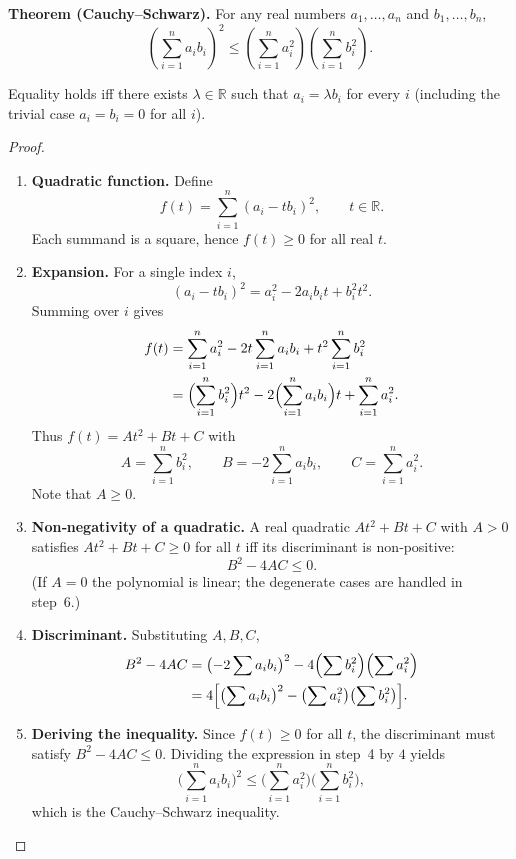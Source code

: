 \textbf{Theorem (Cauchy–Schwarz).}  
For any real numbers $a_{1},\dots ,a_{n}$ and $b_{1},\dots ,b_{n}$,
\[
\left(\sum_{i=1}^{n} a_{i}b_{i}\right)^{2}
\le
\left(\sum_{i=1}^{n} a_{i}^{2}\right)
\left(\sum_{i=1}^{n} b_{i}^{2}\right).
\]

Equality holds iff there exists $\lambda\in\mathbb R$ such that $a_{i}= \lambda b_{i}$ for every $i$ (including the trivial case $a_{i}=b_{i}=0$ for all $i$).

\begin{proof}
\begin{enumerate}
\item \textbf{Quadratic function.}  
Define
\[
f(t)=\sum_{i=1}^{n}(a_{i}-t b_{i})^{2},\qquad t\in\mathbb R .
\]
Each summand is a square, hence $f(t)\ge 0$ for all real $t$.

\item \textbf{Expansion.}  
For a single index $i$,
\[
(a_{i}-t b_{i})^{2}=a_{i}^{2}-2a_{i}b_{i}t+b_{i}^{2}t^{2}.
\]
Summing over $i$ gives
\begin{align*}
f(t)&=\sum_{i=1}^{n}a_{i}^{2}
      -2t\sum_{i=1}^{n}a_{i}b_{i}
      +t^{2}\sum_{i=1}^{n}b_{i}^{2}\\
    &=\Bigl(\sum_{i=1}^{n}b_{i}^{2}\Bigr)t^{2}
      -2\Bigl(\sum_{i=1}^{n}a_{i}b_{i}\Bigr)t
      +\sum_{i=1}^{n}a_{i}^{2}.
\end{align*}
Thus $f(t)=At^{2}+Bt+C$ with
\[
A=\sum_{i=1}^{n}b_{i}^{2},\qquad
B=-2\sum_{i=1}^{n}a_{i}b_{i},\qquad
C=\sum_{i=1}^{n}a_{i}^{2}.
\]
Note that $A\ge 0$.

\item \textbf{Non‑negativity of a quadratic.}  
A real quadratic $At^{2}+Bt+C$ with $A>0$ satisfies $At^{2}+Bt+C\ge0$ for all $t$ iff its discriminant is non‑positive:
\[
B^{2}-4AC\le 0 .
\]
(If $A=0$ the polynomial is linear; the degenerate cases are handled in step~6.)

\item \textbf{Discriminant.}  
Substituting $A,B,C$,
\begin{align*}
B^{2}-4AC
&=\bigl(-2\sum a_{i}b_{i}\bigr)^{2}
  -4\Bigl(\sum b_{i}^{2}\Bigr)\Bigl(\sum a_{i}^{2}\Bigr)\\
&=4\Bigl[\bigl(\sum a_{i}b_{i}\bigr)^{2}
         -\bigl(\sum a_{i}^{2}\bigr)\bigl(\sum b_{i}^{2}\bigr)\Bigr].
\end{align*}

\item \textbf{Deriving the inequality.}  
Since $f(t)\ge0$ for all $t$, the discriminant must satisfy $B^{2}-4AC\le0$. Dividing the expression in step~4 by $4$ yields
\[
\bigl(\sum_{i=1}^{n} a_{i}b_{i}\bigr)^{2}
\le
\bigl(\sum_{i=1}^{n} a_{i}^{2}\bigr)
\bigl(\sum_{i=1}^{n} b_{i}^{2}\bigr),
\]
which is the Cauchy–Schwarz inequality.


\end{enumerate}
\end{proof}
